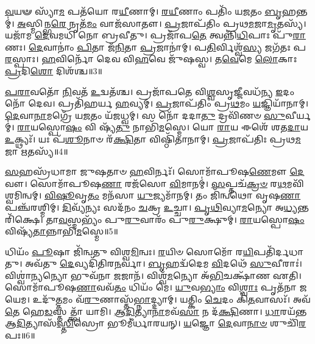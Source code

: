 \-\ul{𑌵}\-𑌯𑍟 𑌸𑍍𑌯𑌾᳴\-\ul{𑌮} 𑌪𑌤᳴𑌯𑍋 𑌰\-\ul{𑌯𑍀}\-𑌣𑌾𑌮𑍍।
\-\ul{𑌰}\-\-\ul{𑌯𑍀}\-𑌣𑌾𑌂 𑌪𑌤𑌿𑌂᳴ 𑌯\-\ul{𑌜}\-𑌤𑌂 \ul{𑌬𑍃}\-𑌹𑌨𑍍𑌤𑌮𑍍॑।
\-\ul{𑌅}\-𑌸𑍍𑌮𑌿𑌨𑍍𑌭\-\ul{𑌰𑍇} 𑌨𑍃𑌤᳴\-\ul{𑌮𑌂} 𑌵𑌾𑌜᳴𑌸𑌾𑌤𑍗।
\-\ul{𑌪𑍍𑌰}\-𑌜𑌾𑌪᳴𑌤𑌿𑌂 𑌪𑍍𑌰𑌥\-\ul{𑌮}\-𑌜𑌾\-\ul{𑌮𑍃}\-𑌤𑌸𑍍𑌯᳴।
𑌯𑌜𑌾᳴𑌮 \ul{𑌦𑍇}\-𑌵𑌮𑌧𑌿᳴ 𑌨𑍋 𑌬𑍍𑌰𑌵𑍀𑌤𑍁।
𑌪𑍍𑌰𑌜𑌾᳴𑌪\-\ul{𑌤𑍇} 𑌤𑍍𑌵𑌨𑍍𑌨𑌿᳴\-\ul{𑌧𑌿}\-𑌪𑌾𑌃 𑌪𑍁᳴\-\ul{𑌰𑌾}\-𑌣𑌃।
\-\ul{𑌦𑍇}\-𑌵𑌾𑌨𑌾𑌂॑ \ul{𑌪𑌿}\-𑌤𑌾 𑌜᳴\-\ul{𑌨𑌿}\-𑌤𑌾 \ul{𑌪𑍍𑌰}\-𑌜𑌾𑌨𑌾॑𑌮𑍍।
𑌪\-\ul{𑌤𑌿}\-𑌰𑍍𑌵𑌿𑌶𑍍𑌵᳴\-\ul{𑌸𑍍𑌯} 𑌜𑌗᳴𑌤𑌃 𑌪\-\ul{𑌰}\-𑌸𑍍𑌪𑌾𑌃।
\-\ul{𑌹}\-𑌵𑌿𑌰𑍍𑌨𑍋᳴ 𑌦𑍇𑌵 𑌵𑌿\-\ul{𑌹}\-𑌵𑍇 𑌜𑍁᳴𑌷𑌸𑍍𑌵।
𑌤\-\ul{𑌵𑍇}\-𑌮𑍇 \ul{𑌲𑍋}\-𑌕𑌾𑌃 \ul{𑌪𑍍𑌰}\-𑌦𑌿\-\ul{𑌶𑍋} 𑌦𑌿𑌶᳴𑌶𑍍𑌚॥3॥

\-\ul{𑌪}\-\-\ul{𑌰𑌾}\-𑌵𑌤𑍋᳴ \ul{𑌨𑌿}\-𑌵𑌤᳴ \ul{𑌉}\-𑌦𑍍𑌵𑌤᳴𑌶𑍍𑌚।
𑌪𑍍𑌰𑌜𑌾᳴𑌪𑌤𑍇 𑌵𑌿\-\ul{𑌶𑍍𑌵}\-𑌸𑍃\-\ul{𑌜𑍍𑌜𑍀}\-𑌵𑌧᳴𑌨𑍍𑌯 \ul{𑌇}\-𑌦𑌂 𑌨𑍋᳴ 𑌦𑍇𑌵।
𑌪𑍍𑌰𑌤𑌿᳴\-𑌹𑌰𑍍𑌯 \ul{𑌹}\-𑌵𑍍𑌯𑌮𑍍।
\-\ul{𑌪𑍍𑌰}\-𑌜𑌾𑌪᳴𑌤𑌿𑌂 𑌪𑍍𑌰\-\ul{𑌥}\-𑌮𑌂 \ul{𑌯}\-𑌜𑍍𑌞𑌿𑌯𑌾᳴𑌨𑌾𑌮𑍍।
\-\ul{𑌦𑍇}\-𑌵𑌾\-\ul{𑌨𑌾}\-𑌮𑌗𑍍𑌰𑍇᳴ 𑌯\-\ul{𑌜}\-𑌤𑌂 𑌯᳴𑌜𑌧𑍍𑌵𑌮𑍍।
𑌸 𑌨𑍋᳴ 𑌦𑌦𑌾\-\ul{𑌤𑍁} 𑌦𑍍𑌰𑌵𑌿᳴𑌣𑍞 \ul{𑌸𑍁}\-𑌵𑍀𑌰𑍍𑌯𑌮𑍍॑।
\-\ul{𑌰𑌾}\-𑌯𑌸𑍍𑌪𑍋\-\ul{𑌷𑌂} 𑌵𑌿 𑌷𑍍𑌯᳴\-\ul{𑌤𑍁} 𑌨𑌾𑌭𑌿᳴\-\ul{𑌮}\-𑌸𑍍𑌮𑍇।
𑌯𑍋 \ul{𑌰𑌾}\-𑌯 𑌈𑌶𑍇᳴ 𑌶𑌤\-\ul{𑌦𑌾}\-𑌯 \ul{𑌉}\-𑌕𑍍𑌥𑍍𑌯𑌃᳴।
𑌯𑌃 𑌪᳴\-\ul{𑌶𑍂}\-𑌨𑌾𑍞 𑌰᳴\-\ul{𑌕𑍍𑌷𑌿}\-𑌤𑌾 𑌵𑌿𑌷𑍍𑌠𑌿᳴𑌤𑌾𑌨𑌾𑌮𑍍।
\-\ul{𑌪𑍍𑌰}\-𑌜𑌾\-𑌪᳴𑌤𑌿𑌃 𑌪𑍍𑌰𑌥\-\ul{𑌮}\-𑌜𑌾 \ul{𑌋}\-𑌤𑌸𑍍𑌯᳴॥4॥

\-\ul{𑌸}\-𑌹𑌸𑍍𑌰᳴𑌧𑌾𑌮𑌾 𑌜𑍁𑌷𑌤𑌾𑍞 \ul{𑌹}\-𑌵𑌿𑌰𑍍𑌨𑌃᳴।
𑌸𑍋𑌮𑌾᳴𑌪𑍂𑌷\-\ul{𑌣𑍇}\-𑌮𑍗 \ul{𑌦𑍇}\-𑌵𑍗।
𑌸𑍋𑌮𑌾᳴𑌪𑍂𑌷\-\ul{𑌣𑌾} 𑌰𑌜᳴𑌸𑍋 \ul{𑌵𑌿}\-𑌮𑌾𑌨𑌮𑍍॑।
\-\ul{𑌸}\-𑌪𑍍𑌤𑌚᳴\-\ul{𑌕𑍍𑌰}\-\-\ul{𑍞} 𑌰\-\ul{𑌥}\-𑌮𑌵𑌿᳴𑌶𑍍𑌵𑌮𑌿𑌨𑍍𑌵𑌮𑍍।
\-\ul{𑌵𑌿}\-\-\ul{𑌷𑍂}\-𑌵𑍃\-\ul{𑌤𑌂} 𑌮𑌨᳴𑌸𑌾 \ul{𑌯𑍁}\-𑌜𑍍𑌯𑌮𑌾᳴𑌨𑌮𑍍।
𑌤𑌂 𑌜𑌿᳴𑌨𑍍𑌵𑌥𑍋 𑌵𑍃𑌷\-\ul{𑌣𑌾} 𑌪𑌞𑍍𑌚᳴𑌰𑌶𑍍𑌮𑌿𑌮𑍍।
\-\ul{𑌦𑌿}\-𑌵𑍍𑌯᳴𑌨𑍍𑌯𑌃 𑌸𑌦᳴𑌨𑌂 \ul{𑌚}\-𑌕𑍍𑌰 \ul{𑌉}\-𑌚𑍍𑌚𑌾।
\-\ul{𑌪𑍃}\-\-\ul{𑌥𑌿}\-𑌵𑍍𑌯𑌾\-\ul{𑌮}\-𑌨𑍍𑌯𑍋 𑌅\-\ul{𑌧𑍍𑌯}\-𑌨𑍍𑌤𑌰𑌿᳴𑌕𑍍𑌷𑍇।
𑌤𑌾\-\ul{𑌵}\-𑌸𑍍𑌮𑌭𑍍𑌯𑌂᳴ 𑌪𑍁\-\ul{𑌰𑍁}\-𑌵𑌾𑌰𑌂᳴ 𑌪𑍁\-\ul{𑌰𑍁}\-𑌕𑍍𑌷𑍁𑌮𑍍।
\-\ul{𑌰𑌾}\-𑌯𑌸𑍍𑌪𑍋\-\ul{𑌷𑌂} 𑌵𑌿𑌷𑍍𑌯᳴\-\ul{𑌤𑌾}\-𑌨𑍍𑌨𑌾𑌭𑌿᳴\-\ul{𑌮}\-𑌸𑍍𑌮𑍇॥5॥

𑌧𑌿𑌯𑌂᳴ \ul{𑌪𑍂}\-𑌷𑌾 𑌜𑌿᳴𑌨𑍍𑌵𑌤𑍁 𑌵𑌿𑌶𑍍𑌵\-\ul{𑌮𑌿}\-𑌨𑍍𑌵𑌃।
\-\ul{𑌰}\-𑌯𑌿𑍞 𑌸𑍋𑌮𑍋᳴ 𑌰\-\ul{𑌯𑌿}\-𑌪𑌤𑌿᳴𑌰𑍍𑌦𑌧𑌾𑌤𑍁।
𑌅𑌵᳴𑌤𑍁 \ul{𑌦𑍇}\-𑌵𑍍𑌯𑌦𑌿᳴𑌤𑌿𑌰\-\ul{𑌨}\-𑌰𑍍𑌵𑌾।
\-\ul{𑌬𑍃}\-𑌹𑌦𑍍𑌵᳴𑌦𑍇𑌮 \ul{𑌵𑌿}\-𑌦𑌥𑍇᳴ \ul{𑌸𑍁}\-𑌵𑍀𑌰𑌾𑌃॑।
𑌵𑌿𑌶𑍍𑌵𑌾॑\-\ul{𑌨𑍍𑌯}\-𑌨𑍍𑌯𑍋 𑌭𑍁𑌵᳴𑌨𑌾 \ul{𑌜}\-𑌜𑌾𑌨᳴।
𑌵𑌿𑌶𑍍𑌵᳴\-\ul{𑌮}\-𑌨𑍍𑌯𑍋 𑌅᳴\-\ul{𑌭𑌿}\-𑌚𑌕𑍍𑌷𑌾᳴𑌣 𑌏𑌤𑌿।
𑌸𑍋𑌮𑌾᳴𑌪𑍂𑌷\-\ul{𑌣𑌾}\-𑌵𑌵᳴\-\ul{𑌤𑌂} 𑌧𑌿𑌯𑌂᳴ 𑌮𑍇।
\-\ul{𑌯𑍁}\-𑌵\-\ul{𑌭𑍍𑌯𑌾𑌂} 𑌵𑌿\-\ul{𑌶𑍍𑌵𑌾𑌃} 𑌪𑍃𑌤᳴𑌨𑌾 𑌜𑌯𑍇𑌮।
𑌉𑌦𑍁᳴\-\ul{𑌤𑍍𑌤}\-𑌮𑌂 𑌵᳴\-\ul{𑌰𑍁}\-𑌣𑌾𑌸𑍍𑌤᳴\-\ul{𑌭𑍍𑌨𑌾}\-𑌦𑍍𑌦𑍍𑌯𑌾𑌮𑍍।
𑌯𑌤𑍍𑌕𑌿𑌂 \ul{𑌚𑍇}\-𑌦𑌂 𑌕𑌿᳴\-\ul{𑌤}\-𑌵𑌾𑌸𑌃᳴।
𑌅𑌵᳴ \ul{𑌤𑍇} 𑌹𑍇\-\ul{𑌡}\-𑌸𑍍𑌤𑌤𑍍𑌤𑍍𑌵𑌾᳴ 𑌯𑌾𑌮𑌿।
\-\ul{𑌆}\-\-\ul{𑌦𑌿}\-𑌤𑍍𑌯𑌾\-\ul{𑌨𑌾}\-𑌮𑌵᳴\-\ul{𑌸𑌾} 𑌨 𑌦᳴\-\ul{𑌕𑍍𑌷𑌿}\-𑌣𑌾।
\-\ul{𑌧𑌾}\-𑌰𑌯᳴𑌨𑍍𑌤 𑌆\-\ul{𑌦𑌿}\-𑌤𑍍𑌯𑌾𑌸᳴\-\ul{𑌸𑍍𑌤𑌿}\-𑌸𑍍𑌰𑍋 𑌭𑍂𑌮𑍀॑𑌰𑍍𑌧𑌾𑌰𑌯𑌨𑍍।
\-\ul{𑌯}\-𑌜𑍍𑌞𑍋 \ul{𑌦𑍇}\-𑌵𑌾\-\ul{𑌨𑌾}\-\-\ul{𑍞} 𑌶𑍁𑌚𑌿᳴\-\ul{𑌰}\-𑌪𑌃॥6॥\anuvakamend[\-\ul{𑌮}\-\-\ul{𑌨𑍀}\-𑌷𑌾\-𑌽𑌸𑍍𑌤𑍁᳴ \ul{𑌚}\-𑌰𑍍𑌤\-\ul{𑌸𑍍𑌯𑌾}\-𑌸𑍍𑌮𑍇 𑌕𑌿᳴\-\ul{𑌤}\-𑌵𑌾𑌸᳴\-\ul{𑌶𑍍𑌚}\-𑌤𑍍𑌵𑌾𑌰𑌿᳴ 𑌚]

